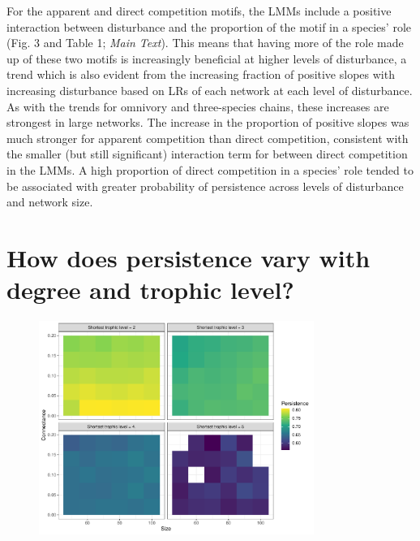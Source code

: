 \documentclass[12pt]{article}
\begin{document}
\begin{spacing}{2.0}
    
    For the apparent and direct competition motifs, the LMMs include a positive interaction between disturbance and the proportion of the motif in a species' role (Fig. 3 and Table 1; \emph{Main Text}).
    This means that having more of the role made up of these two motifs is increasingly beneficial at higher levels of disturbance, a trend which is also evident from the increasing fraction of positive slopes with increasing disturbance based on LRs of each network at each level of disturbance. %
    As with the trends for omnivory and three-species chains, these increases are strongest in large networks. %
    The increase in the proportion of positive slopes was much stronger for apparent competition than direct competition, consistent with the smaller (but still significant) interaction term for between direct competition in the LMMs.
    A high proportion of direct competition in a species' role tended to be associated with greater probability of persistence across levels of disturbance and network size.
                
            

\section{How does persistence vary with degree and trophic level?}

  \begin{figure}
     \centering
     \includegraphics[width=0.8\textwidth]{figures/heatmap_STL_allCS_BP0.pdf}
    

\end{figure}
\end{spacing}
\end{document}
